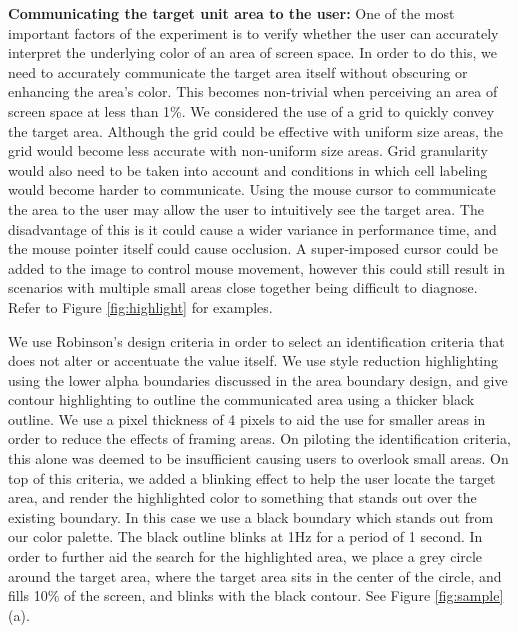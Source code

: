 \textbf{Communicating the target unit area to the user: } One of the most important factors of the experiment is to verify whether the user can accurately interpret the underlying color of an area of screen space. In order to do this, we need to accurately communicate the target area itself without obscuring or enhancing the area's color. This becomes non-trivial when perceiving an area of screen space at less than 1\%. We considered the use of a grid to quickly convey the target area. Although the grid could be effective with uniform size areas, the grid would become less accurate with non-uniform size areas. Grid granularity would also need to be taken into account and conditions in which cell labeling would become harder to communicate.
Using the mouse cursor to communicate the area to the user may allow the user to intuitively see the target area. The disadvantage of this is it could cause a wider variance in performance time, and the mouse pointer itself could cause occlusion. A super-imposed cursor could be added to the image to control mouse movement, however this could still result in scenarios with multiple small areas close together being difficult to diagnose. Refer to Figure \ref{fig:highlight} for examples.

 We use Robinson's design criteria \cite{robinson2011highlighting} in order to select an identification criteria that does not alter or accentuate the value itself. We use style reduction highlighting using the lower alpha boundaries discussed in the area boundary design, and give contour highlighting to outline the communicated area using a thicker black outline. We use a pixel thickness of 4 pixels to aid the use for smaller areas in order to reduce the effects of framing areas.
  On piloting the identification criteria, this alone was deemed to be insufficient causing users to overlook small areas. On top of this criteria, we added a blinking effect to help the user locate the target area, and render the highlighted color to something that stands out over the existing boundary. In this case we use a black boundary which stands out from our color palette. The black outline blinks at 1Hz for a period of 1 second. In order to further aid the search for the highlighted area, we place a grey circle around the target area, where the target area sits in the center of the circle, and fills 10\% of the screen, and blinks with the black contour. See Figure \ref{fig:sample} (a). 


